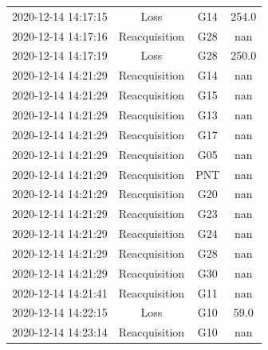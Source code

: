 \begin{enumerate}
\begin{longtabu}{cccc}
2020{-}12{-}14 14:17:15&Loss&G14&254.0\\%
2020{-}12{-}14 14:17:16&Reacquisition&G28&nan\\%
2020{-}12{-}14 14:17:19&Loss&G28&250.0\\%
2020{-}12{-}14 14:21:29&Reacquisition&G14&nan\\%
2020{-}12{-}14 14:21:29&Reacquisition&G15&nan\\%
2020{-}12{-}14 14:21:29&Reacquisition&G13&nan\\%
2020{-}12{-}14 14:21:29&Reacquisition&G17&nan\\%
2020{-}12{-}14 14:21:29&Reacquisition&G05&nan\\%
2020{-}12{-}14 14:21:29&Reacquisition&PNT&nan\\%
2020{-}12{-}14 14:21:29&Reacquisition&G20&nan\\%
2020{-}12{-}14 14:21:29&Reacquisition&G23&nan\\%
2020{-}12{-}14 14:21:29&Reacquisition&G24&nan\\%
2020{-}12{-}14 14:21:29&Reacquisition&G28&nan\\%
2020{-}12{-}14 14:21:29&Reacquisition&G30&nan\\%
2020{-}12{-}14 14:21:41&Reacquisition&G11&nan\\%
2020{-}12{-}14 14:22:15&Loss&G10&59.0\\%
2020{-}12{-}14 14:23:14&Reacquisition&G10&nan\\%
\hline%
\end{longtabu}%
\end{enumerate}

